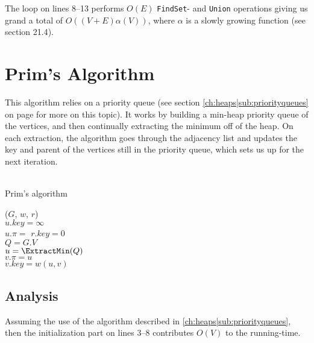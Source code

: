 The loop on lines 8--13 performs $O(E)$ \texttt{FindSet}- and \texttt{Union}
operations giving us grand a total of $O((V+E) \alpha(V))$, where $\alpha$
is a slowly growing function (see section 21.4\cite[p. 573]{clrs}).

\newpage
\section{Prim's Algorithm}
This algorithm relies on a priority queue (see section
\ref{ch:heaps|sub:priorityqueues} on page \pageref{ch:heaps|sub:priorityqueues}
for more on this topic). It works by building a min-heap priority queue of the
vertices, and then continually extracting the minimum off of the heap. On each
extraction, the algorithm goes through the adjacency list and updates the key
and parent of the vertices still in the priority queue, which sets us up for
the next iteration.
\\\\
\begin{algorithm}[H]
	\caption{Prim's algorithm}
	\label{alg:prim-mst}
	
	
	
	
	
	\BlankLine
	\PrimMST($G$, $w$, $r$) \\
	\Begin
	{
		{
			$u.key = \infty$ \\
			$u.\pi = $ \Nil
		}
		$r.key = 0$ \\
		$Q = G.V$ \\
		
		{
			$u = \ExtractMin(Q)$ \\
			{
				{
					$v.\pi = u$ \\
					$v.key = w(u, v)$
				}
			}
		}
	}
\end{algorithm}

\subsection{Analysis}
Assuming the use of the algorithm described in
\ref{ch:heaps|sub:priorityqueues}, then the initialization part on lines 3--8
contributes $O(V)$ to the running-time.

